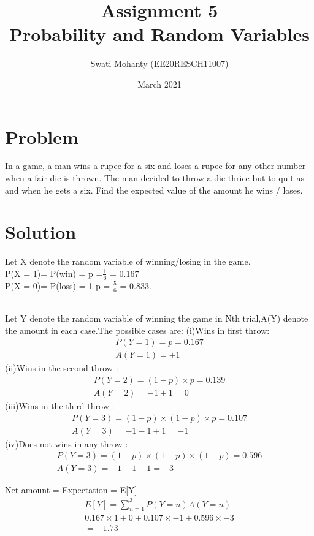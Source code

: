 \documentclass[journal,12pt,twocolumn]{IEEEtran}
\title{Assignment 5
\\Probability and Random Variables }
\author{Swati Mohanty (EE20RESCH11007) }
\date{March 2021}
\begin{document}
\maketitle


\section{Problem}
In a game, a man wins a rupee for a six and
loses a rupee for any other number when a
fair die is thrown. The man decided to throw
a die thrice but to quit as and when he gets a
six. Find the expected value of the amount he
wins / loses.

\section{Solution}
Let X denote the random variable of winning/losing in the game.
\\P(X = 1)= P(win) = p =$\frac{1}{6}$  = 0.167
\\P(X = 0)= P(loss) = 1-p = $\frac{5}{6}$ = 0.833.
 
\\Let Y denote the random variable of winning the game in Nth trial,A(Y) denote the amount in each case.The possible cases are:
(i)Wins in first throw:\begin{align}
    P(Y=1) = p = 0.167
    \\A(Y=1) = +1
\end{align}
(ii)Wins in the second throw :\begin{align}
    P(Y=2) = (1-p)\times p = 0.139
    \\A(Y=2) = -1+1=0
\end{align}
(iii)Wins in the third throw :\begin{align}
    P(Y=3) = (1-p)\times(1-p)\times p = 0.107
    \\A(Y=3) = -1-1+1=-1
\end{align}
(iv)Does not wins in any throw :\begin{align}
    P(Y=3) = (1-p)\times(1-p)\times (1-p) = 0.596
    \\A(Y=3) = -1-1-1=-3
\end{align}

Net amount = Expectation = E[Y] 
\begin{align}
    E[Y] =  \sum_{n=1}^{3} P(Y=n)A(Y=n)
    \\0.167\times1 + 0 +0.107\times-1 + 0.596\times-3
    \\=-1.73
\end{align}
\end{document}
